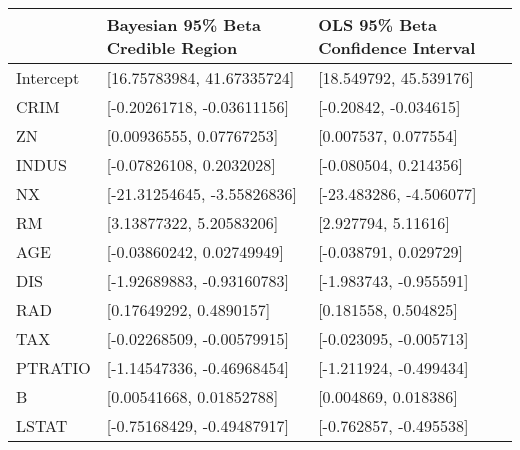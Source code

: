\begin{tabular}{lll}
\hline
           & Bayesian 95\% Beta Credible Region   & OLS 95\% Beta Confidence Interval   \\
\hline
 Intercept & [16.75783984, 41.67335724]          & [18.549792, 45.539176]             \\
 CRIM      & [-0.20261718, -0.03611156]          & [-0.20842, -0.034615]              \\
 ZN        & [0.00936555, 0.07767253]            & [0.007537, 0.077554]               \\
 INDUS     & [-0.07826108, 0.2032028]            & [-0.080504, 0.214356]              \\
 NX        & [-21.31254645, -3.55826836]         & [-23.483286, -4.506077]            \\
 RM        & [3.13877322, 5.20583206]            & [2.927794, 5.11616]                \\
 AGE       & [-0.03860242, 0.02749949]           & [-0.038791, 0.029729]              \\
 DIS       & [-1.92689883, -0.93160783]          & [-1.983743, -0.955591]             \\
 RAD       & [0.17649292, 0.4890157]             & [0.181558, 0.504825]               \\
 TAX       & [-0.02268509, -0.00579915]          & [-0.023095, -0.005713]             \\
 PTRATIO   & [-1.14547336, -0.46968454]          & [-1.211924, -0.499434]             \\
 B         & [0.00541668, 0.01852788]            & [0.004869, 0.018386]               \\
 LSTAT     & [-0.75168429, -0.49487917]          & [-0.762857, -0.495538]             \\
\hline
\end{tabular}